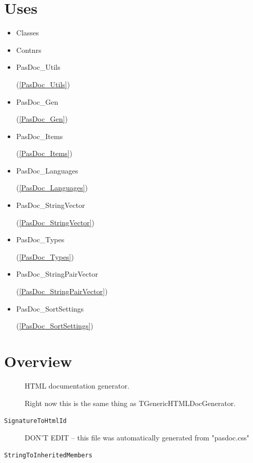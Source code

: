 \documentclass{report}
\begin{document}
\section{Uses}
\begin{itemize}
\item \begin{ttfamily}Classes\end{ttfamily}\item \begin{ttfamily}Contnrs\end{ttfamily}\item \begin{ttfamily}PasDoc{\_}Utils\end{ttfamily}(\ref{PasDoc_Utils})\item \begin{ttfamily}PasDoc{\_}Gen\end{ttfamily}(\ref{PasDoc_Gen})\item \begin{ttfamily}PasDoc{\_}Items\end{ttfamily}(\ref{PasDoc_Items})\item \begin{ttfamily}PasDoc{\_}Languages\end{ttfamily}(\ref{PasDoc_Languages})\item \begin{ttfamily}PasDoc{\_}StringVector\end{ttfamily}(\ref{PasDoc_StringVector})\item \begin{ttfamily}PasDoc{\_}Types\end{ttfamily}(\ref{PasDoc_Types})\item \begin{ttfamily}PasDoc{\_}StringPairVector\end{ttfamily}(\ref{PasDoc_StringPairVector})\item \begin{ttfamily}PasDoc{\_}SortSettings\end{ttfamily}(\ref{PasDoc_SortSettings})\end{itemize}
\section{Overview}
\begin{description}
\item[\texttt{\begin{ttfamily}TGenericHTMLDocGenerator\end{ttfamily} Class}]HTML documentation generator.
\item[\texttt{\begin{ttfamily}THTMLDocGenerator\end{ttfamily} Class}]Right now this is the same thing as TGenericHTMLDocGenerator.
\end{description}
\begin{description}
\item[\texttt{SignatureToHtmlId}]DON'T EDIT -- this file was automatically generated from "pasdoc.css"
\item[\texttt{StringToInheritedMembers}]
\end{description}
\end{document}
